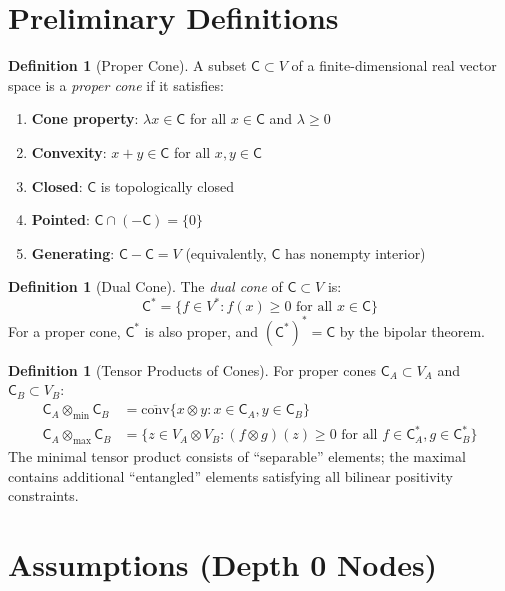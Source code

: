 \documentclass[11pt,a4paper]{article}
\theoremstyle{definition}
\newtheorem{definition}[theorem]{Definition}
\newcommand{\C}{\mathsf{C}}
\newcommand{\Cstar}{\mathsf{C}^*}
\newcommand{\tmin}{\otimes_{\min}}
\newcommand{\tmax}{\otimes_{\max}}
\begin{document}
\section{Preliminary Definitions}

\begin{definition}[Proper Cone]
A subset $\C \subset V$ of a finite-dimensional real vector space is a \emph{proper cone} if it satisfies:
\begin{enumerate}[label=(\roman*)]
    \item \textbf{Cone property}: $\lambda x \in \C$ for all $x \in \C$ and $\lambda \geq 0$
    \item \textbf{Convexity}: $x + y \in \C$ for all $x, y \in \C$
    \item \textbf{Closed}: $\C$ is topologically closed
    \item \textbf{Pointed}: $\C \cap (-\C) = \{0\}$
    \item \textbf{Generating}: $\C - \C = V$ (equivalently, $\C$ has nonempty interior)
\end{enumerate}
\end{definition}

\begin{definition}[Dual Cone]
The \emph{dual cone} of $\C \subset V$ is:
\[
\Cstar = \{f \in V^* : f(x) \geq 0 \text{ for all } x \in \C\}
\]
For a proper cone, $\Cstar$ is also proper, and $(\Cstar)^* = \C$ by the bipolar theorem.
\end{definition}

\begin{definition}[Tensor Products of Cones]
For proper cones $\C_A \subset V_A$ and $\C_B \subset V_B$:
\begin{align}
\C_A \tmin \C_B &= \overline{\mathrm{conv}}\{x \otimes y : x \in \C_A, y \in \C_B\} \\
\C_A \tmax \C_B &= \{z \in V_A \otimes V_B : (f \otimes g)(z) \geq 0 \text{ for all } f \in \C_A^*, g \in \C_B^*\}
\end{align}
The minimal tensor product consists of ``separable'' elements; the maximal contains additional ``entangled'' elements satisfying all bilinear positivity constraints.
\end{definition}

\section{Assumptions (Depth 0 Nodes)}
\end{document}
